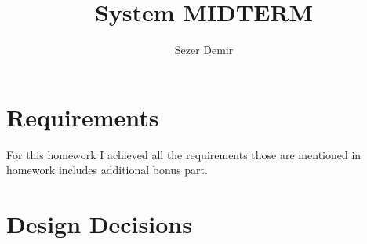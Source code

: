 \documentclass{article}
\title{System MIDTERM}
\author{Sezer Demir }
\begin{document}
\maketitle
\section{Requirements}

\setlength{\parindent}{8ex}
\hspace{\parindent} For this homework I achieved all the requirements those are mentioned in homework includes additional bonus part.\par
\section{Design Decisions}
\end{document}
